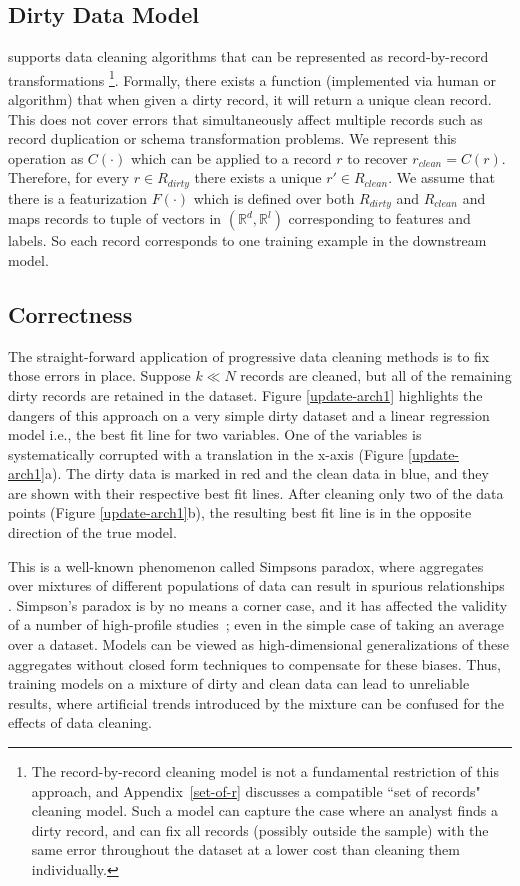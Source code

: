 \subsection{Dirty Data Model}\label{dmodel}
\sys supports data cleaning algorithms that can be represented as record-by-record transformations \footnote{\small The record-by-record cleaning model is not a fundamental restriction of this approach, and Appendix~\ref{set-of-r} discusses a compatible ``set of records" cleaning model.
Such a model can capture the case where an analyst finds a dirty record, and can fix all records (possibly outside the sample) with the same error throughout the dataset at a lower cost than cleaning them individually.}.
Formally, there exists a function (implemented via human or algorithm) that when given a dirty record, it will return a unique clean record.
This does not cover errors that simultaneously affect multiple records such as record duplication or schema transformation problems.
We represent this operation as $C(\cdot)$ which can be applied to a record $r$ to recover $r_{clean} = C(r)$.
Therefore, for every $r \in R_{dirty}$ there exists a unique $r' \in R_{clean}$.
We assume that there is a featurization $F(\cdot)$ which is defined over both $R_{dirty}$ and $R_{clean}$ and maps records to tuple of vectors in $(\mathbb{R}^d, \mathbb{R}^l)$ corresponding to features and labels.
So each record corresponds to one training example in the downstream model.

\subsection{Correctness}\label{correctness}  
The straight-forward application of progressive data cleaning methods is to fix those errors in place.
Suppose $k \ll N$ records are cleaned, but all of the remaining dirty records are retained in the dataset.
Figure \ref{update-arch1} highlights the dangers of this approach on a very simple dirty dataset and a linear regression model i.e., the best fit line for two variables. 
One of the variables is systematically corrupted with a translation in the x-axis (Figure \ref{update-arch1}a).
The dirty data is marked in red and the clean data in blue, and they are shown with their respective best fit lines.
After cleaning only two of the data points (Figure \ref{update-arch1}b), the resulting best fit line is in the opposite direction of the true model.

This is a well-known phenomenon called Simpsons paradox, where aggregates over mixtures of different populations of data can result in spurious relationships \cite{simpson1951interpretation}.
Simpson's paradox is by no means a corner case, and it has affected the validity of a number of high-profile studies~\cite{simpsonsparadox}; even in the simple case of taking an average over a dataset.
Models can be viewed as high-dimensional generalizations of these aggregates without closed form techniques to compensate for these biases.
Thus, training models on a mixture of dirty and clean data can lead to unreliable results, where artificial trends introduced by the mixture can be confused for the effects of data cleaning.

